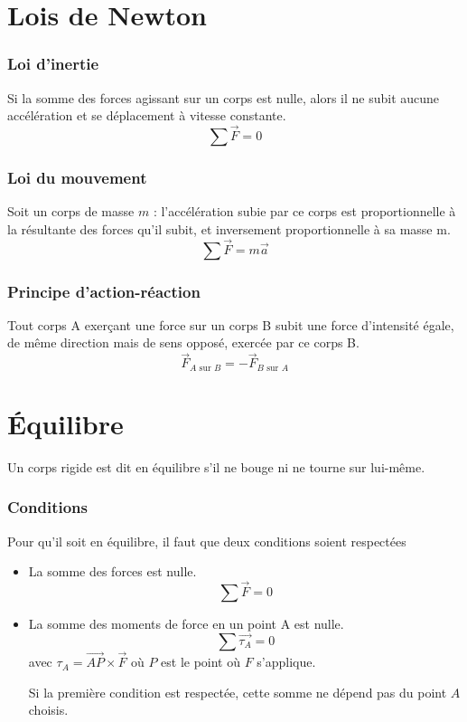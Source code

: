 \part{Lois de Newton}
\section{Loi d'inertie}
Si la somme des forces agissant sur un corps est nulle, alors il ne subit aucune accélération et se déplacement à vitesse constante.\\
\[ \sum \vec{F} = 0 \]

\section{Loi du mouvement}
Soit un corps de masse $m$ : l'accélération subie par ce corps est proportionnelle à la résultante des forces qu'il subit, et inversement proportionnelle à sa masse m.\\
\[ \sum \vec{F} = m \vec{a} \]

\section{Principe d'action-réaction}
Tout corps A exerçant une force sur un corps B subit une force d'intensité égale, de même direction mais de sens opposé, exercée par ce corps B.\\
\[ \vec{F}_{A\text{ sur }B} = -\vec{F}_{B\text{ sur }A} \]

\part{Équilibre}
Un corps rigide est dit en équilibre s'il ne bouge ni ne tourne sur lui-même.
\section{Conditions}
Pour qu'il soit en équilibre, il faut que deux conditions soient respectées
\begin{itemize}
	\item La somme des forces est nulle.
		\[ \sum \vec{F} = 0 \]
	\item La somme des moments de force en un point A est nulle.
		\[ \sum \vec{\tau_A} = 0 \]
		avec
		$\tau_A = \vec{AP} \times \vec{F}$ où $P$ est le point où $F$ s'applique.

		Si la première condition est respectée, cette somme ne dépend pas du point $A$ choisis.
\end{itemize}

